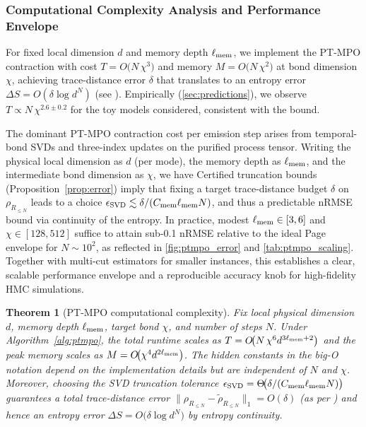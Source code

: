 \documentclass[11pt,a4paper]{article}
\newcommand{\HMC}{\textsc{HMC}\xspace}
\theoremstyle{plain}
\newtheorem{theorem}{Theorem}
\theoremstyle{definition}
\theoremstyle{remark}
\begin{document}
\subsubsection{Computational Complexity Analysis and Performance Envelope}
For fixed local dimension $d$ and memory depth $\ell_{\rm mem}$, we implement the PT-MPO contraction with cost $T=O\!\big(N\,\chi^3\big)$ and memory $M=O\!\big(N\,\chi^2\big)$ at bond dimension $\chi$, achieving trace-distance error $\delta$ that translates to an entropy error $\Delta S=O(\delta\log d^N)$ (see ). Empirically (\cref{sec:predictions}), we observe $T\propto N\,\chi^{2.6\pm0.2}$ for the toy models considered, consistent with the bound.

The dominant PT-MPO contraction cost per emission step arises from temporal-bond SVDs and three-index updates on the purified process tensor. Writing the physical local dimension as $d$ (per mode), the memory depth as $\ell_{\rm mem}$, and the intermediate bond dimension as $\chi$, we have
Certified truncation bounds (Proposition~\ref{prop:error}) imply that fixing a target trace-distance budget $\delta$ on $\rho_{R_{\le N}}$ leads to a choice $\epsilon_{\rm SVD}\lesssim \delta/(C_{\rm mem}\ell_{\rm mem} N)$, and thus a predictable nRMSE bound via continuity of the entropy. In practice, modest $\ell_{\rm mem}\in[3,6]$ and $\chi\in[128,512]$ suffice to attain sub-0.1 nRMSE relative to the ideal Page envelope for $N\sim 10^2$, as reflected in \cref{fig:ptmpo_error} and \cref{tab:ptmpo_scaling}. Together with multi-cut estimators for smaller instances, this establishes a clear, scalable performance envelope and a reproducible accuracy knob for high-fidelity \HMC{} simulations.

\begin{theorem}[PT-MPO computational complexity]\label{thm:ptmpo-complexity}
Fix local physical dimension $d$, memory depth $\ell_{\rm mem}$, target bond $\chi$, and number of steps $N$. Under Algorithm~\ref{alg:ptmpo}, the total runtime scales as $T=O\!\big(N\,\chi^6 d^{3\ell_{\rm mem}+2}\big)$ and the peak memory scales as $M=O\!\big(\chi^4 d^{2\ell_{\rm mem}}\big)$. The hidden constants in the big-O notation depend on the implementation details but are independent of $N$ and $\chi$. Moreover, choosing the SVD truncation tolerance $\epsilon_{\rm SVD}=\Theta\!\big(\delta/(C_{\rm mem}\ell_{\rm mem} N)\big)$ guarantees a total trace-distance error $\|\rho_{R_{\le N}}-\tilde\rho_{R_{\le N}}\|_1=O(\delta)$ (as per ) and hence an entropy error $\Delta S=O\!\big(\delta\log d^N\big)$ by entropy continuity. 
\end{theorem}
\end{document}
